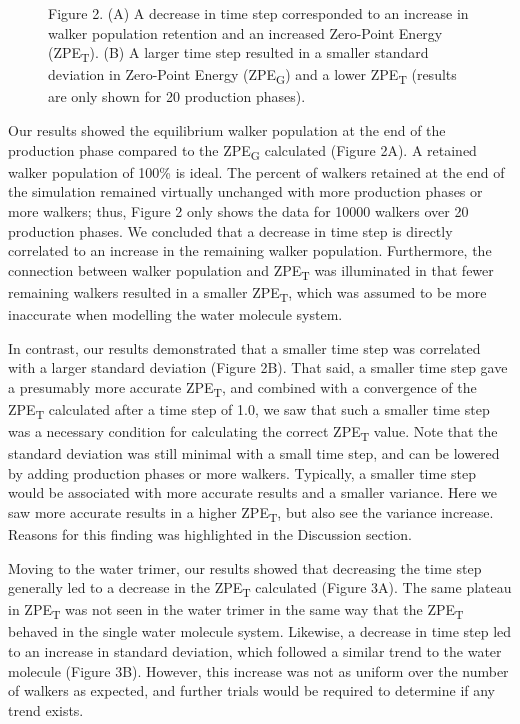 \documentclass[journal=jacsat,manuscript=article]{achemso}
\begin{document}
\begin{figure}[H]
\begin{subfigure}{.5\textwidth}
\end{subfigure}
\caption{Figure 2. (A) A decrease in time step corresponded to an increase in walker population retention and an increased Zero-Point Energy (ZPE\textsubscript{T}).
(B) A larger time step resulted in a smaller standard deviation in Zero-Point Energy (ZPE\textsubscript{G}) and a lower ZPE\textsubscript{T} (results are only shown for 20 production phases).}
\end{figure}

Our results showed the equilibrium walker population at the end of the production phase compared to the ZPE\textsubscript{G} calculated (Figure 2A). A retained walker population of 100\% is ideal. The percent of walkers retained at the end of the simulation remained virtually unchanged with more production phases or more walkers; thus, Figure 2 only shows the data for 10000 walkers over 20 production phases. We concluded that a decrease in time step is directly correlated to an increase in the remaining walker population. Furthermore, the connection between walker population and ZPE\textsubscript{T} was illuminated in that fewer remaining walkers resulted in a smaller ZPE\textsubscript{T}, which was assumed to be more inaccurate when modelling the water molecule system. 

In contrast, our results demonstrated that a smaller time step was correlated with a larger standard deviation (Figure 2B). That said, a smaller time step gave a presumably more accurate ZPE\textsubscript{T}, and combined with a convergence of the ZPE\textsubscript{T} calculated after a time step of 1.0, we saw that such a smaller time step was a necessary condition for calculating the correct ZPE\textsubscript{T} value. Note that the standard deviation was still minimal with a small time step, and can be lowered by adding production phases or more walkers. Typically, a smaller time step would be associated with more accurate results and a smaller variance. Here we saw more accurate results in a higher ZPE\textsubscript{T}, but also see the variance increase. Reasons for this finding was highlighted in the Discussion section.

Moving to the water trimer, our results showed that decreasing the time step generally led to a decrease in the ZPE\textsubscript{T} calculated (Figure 3A). The same plateau in ZPE\textsubscript{T} was not seen in the water trimer in the same way that the ZPE\textsubscript{T} behaved in the single water molecule system. Likewise, a decrease in time step led to an increase in standard deviation, which followed a similar trend to the water molecule (Figure 3B). However, this increase was not as uniform over the number of walkers as expected, and further trials would be required to determine if any trend exists. 
\end{document}
